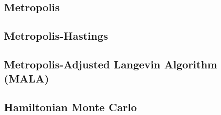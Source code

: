 \documentclass{article}
\begin{document}
\subsection{Metropolis}
\subsection{Metropolis-Hastings}
\subsection{Metropolis-Adjusted Langevin Algorithm (MALA)}
\subsection{Hamiltonian Monte Carlo}







% 
% 
\end{document}
